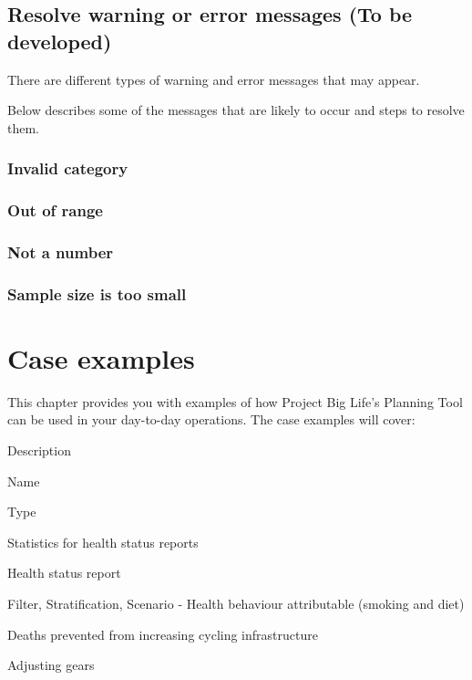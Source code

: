 \documentclass[]{book}
\begin{document}
\section{Resolve warning or error messages (To be
developed)}\label{resolve-warning-or-error-messages-to-be-developed}

There are different types of warning and error messages that may appear.

Below describes some of the messages that are likely to occur and steps
to resolve them.

\subsection{Invalid category}\label{invalid-category}

\subsection{Out of range}\label{out-of-range}

\subsection{Not a number}\label{not-a-number}

\subsection{Sample size is too small}\label{sample-size-is-too-small}

\hypertarget{caseexamples}{\chapter{Case examples}\label{caseexamples}}

This chapter provides you with examples of how Project Big Life's
Planning Tool can be used in your day-to-day operations. The case
examples will cover:

Description

Name

Type

Statistics for health status reports

Health status report

Filter, Stratification, Scenario - Health behaviour attributable
(smoking and diet)

Deaths prevented from increasing cycling infrastructure

Adjusting gears
\end{document}
